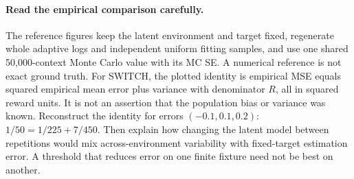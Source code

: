 \documentclass[11pt]{scrartcl}
\begin{document}
\paragraph{Read the empirical comparison carefully.} The reference figures keep
the latent environment and target fixed, regenerate whole adaptive logs and
independent uniform fitting samples, and use one shared 50,000-context Monte
Carlo value with its MC SE. A numerical reference is not exact ground truth.
For SWITCH, the plotted identity is empirical MSE equals squared empirical mean
error plus variance with denominator $R$, all in squared reward units. It is
not an assertion that the population bias or variance was known. Reconstruct
the identity for errors $(-0.1,0.1,0.2)$: $1/50=1/225+7/450$.
Then explain how changing the latent model between repetitions would mix
across-environment variability with fixed-target estimation error. A threshold
that reduces error on one finite fixture need not be best on another.
\end{document}
